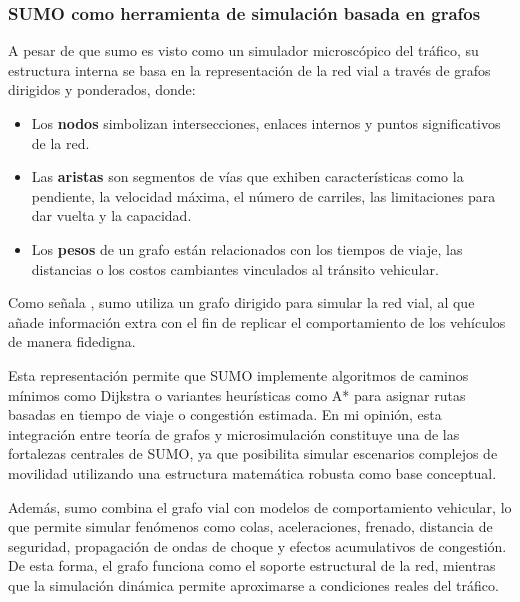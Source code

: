 \subsubsection{SUMO como herramienta de simulación basada en grafos}
A pesar de que \Acrfull{sumo} es visto como un simulador microscópico del tráfico, su estructura interna se basa en la representación de la red vial a través de grafos 
dirigidos y ponderados, donde:

\begin{itemize}
    \item Los \textbf{nodos} simbolizan intersecciones, enlaces internos y puntos significativos de la red.
    \item Las \textbf{aristas} son segmentos de vías que exhiben características como la pendiente, la velocidad máxima, el número de carriles, las limitaciones para dar 
    vuelta y la capacidad.
    \item Los \textbf{pesos} de un grafo están relacionados con los tiempos de viaje, las distancias o los costos cambiantes vinculados al tránsito vehicular.
\end{itemize}

Como señala \cite{krajzewicz_recent_2012}, \acrshort{sumo} utiliza un grafo dirigido para simular la red vial, al que añade información extra con el fin de replicar el comportamiento de los 
vehículos de manera fidedigna.

Esta representación permite que SUMO implemente algoritmos de caminos mínimos como Dijkstra o variantes heurísticas como A* para asignar rutas basadas en tiempo de viaje o 
congestión estimada. En mi opinión, esta integración entre teoría de grafos y microsimulación constituye una de las fortalezas centrales de SUMO, ya que posibilita simular 
escenarios complejos de movilidad utilizando una estructura matemática robusta como base conceptual.

Además, \acrshort{sumo} combina el grafo vial con modelos de comportamiento vehicular, lo que permite simular fenómenos como colas, aceleraciones, frenado, distancia de 
seguridad, propagación de ondas de choque y efectos acumulativos de congestión. De esta forma, el grafo funciona como el soporte estructural de la red, mientras que la 
simulación dinámica permite aproximarse a condiciones reales del tráfico.

